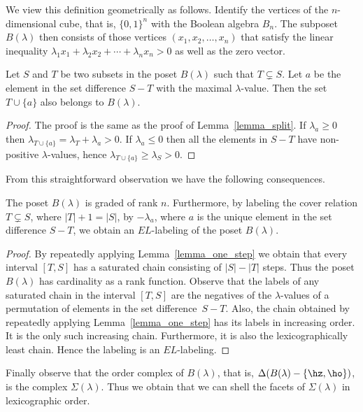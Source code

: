 We view this definition geometrically as follows.
Identify the vertices of the $n$-dimensional cube, that is,
$\{0,1\}^{n}$ with the Boolean algebra $B_{n}$.
The subposet $B(\lambda)$ then consists of those
vertices $(x_{1}, x_{2}, \ldots, x_{n})$
that satisfy the linear inequality
$\lambda_{1} x_{1} + \lambda_{2} x_{2} + \cdots + \lambda_{n} x_{n} > 0$
as well as the zero vector.
\begin{lemma}
Let $S$ and $T$ be two subsets in the poset $B(\lambda)$
such that $T \subsetneq S$. Let $a$ be the element
in the set difference $S-T$ with the maximal $\lambda$-value.
Then the set $T \cup \{a\}$ also belongs to $B(\lambda)$.
\label{lemma_one_step}
\end{lemma}
\begin{proof}
The proof is the same as the proof of
Lemma~\ref{lemma_split}.
If $\lambda_{a} \geq 0$ then
$\lambda_{T \cup \{a\}}
=
\lambda_{T}
+
\lambda_{a}
> 0$.
If $\lambda_{a} \leq 0$ then
all the elements in $S-T$ have non-positive $\lambda$-values,
hence
$\lambda_{T \cup \{a\}} \geq \lambda_{S} > 0$.
\end{proof}

From this straightforward observation we have
the following consequences.
\begin{prop}
The poset $B(\lambda)$ is graded of rank $n$.
Furthermore, by labeling the cover relation
$T \subsetneq S$, where $|T|+1=|S|$, 
by $-\lambda_{a}$, where $a$ is the unique element in the set difference
$S-T$, we obtain an $EL$-labeling of the poset $B(\lambda)$.
\end{prop}
\begin{proof}
By repeatedly applying Lemma~\ref{lemma_one_step}
we obtain that every interval $[T,S]$ has
a saturated chain consisting of $|S|-|T|$ steps.
Thus the poset $B(\lambda)$ has cardinality
as a rank function.
Observe that the labels of any saturated chain in the interval $[T,S]$
are the negatives
of the $\lambda$-values 
of a permutation of elements in the set difference~$S-T$.
Also, the chain obtained
by repeatedly applying Lemma~\ref{lemma_one_step}
has its labels
in increasing order.
It is the only such increasing chain. Furthermore,
it is also the lexicographically least chain.
Hence the labeling is an $EL$-labeling.
\end{proof}

Finally observe that
the order complex of $B(\lambda)$,
that is,
$\Delta(B(\lambda) - \{\hz,\ho\})$,
is the complex $\Sigma(\lambda)$.
Thus we obtain that 
we can shell the facets of $\Sigma(\lambda)$
in lexicographic order.



